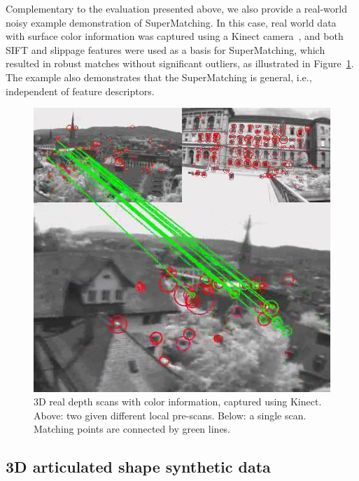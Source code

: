 Complementary to the evaluation presented above,
we also provide a real-world noisy example demonstration of SuperMatching.
In this case, real world data with surface color information was captured using a Kinect camera~\cite{Kinect12},
and both SIFT and slippage features were used as a basis for SuperMatching,
which resulted in robust matches without significant outliers, as illustrated in Figure~\ref{fig:3DReal}.
The example also demonstrates that the SuperMatching is general, i.e., independent of feature descriptors.

\begin{figure}[h]
\centering
  \includegraphics[width=0.9\linewidth]{figures/3DReal.jpg}
  \caption{3D real depth scans with color information, captured using Kinect.
  Above: two given different local pre-scans.  Below: a single scan.
  Matching points are connected by green lines.}
\label{fig:3DReal}
\end{figure}

\subsection{3D articulated shape synthetic data}
\label{subsec:3darticulated}

